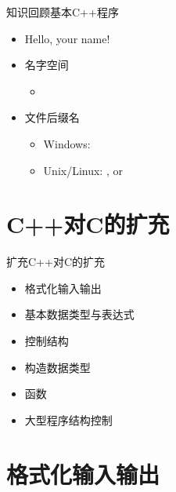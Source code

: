 \begin{frame}[fragile]{知识回顾}{基本C++程序}
  \begin{spacing}{1.1}%
  \begin{itemize}
  \item Hello, your name!\\
    \begin{center}
      \begin{minipage}{0.45\linewidth}
      \end{minipage}
    \end{center}
  \item 名字空间
    \begin{itemize}
    \item {}
    \end{itemize}
  \item 文件后缀名
    \begin{itemize}
    \item Windows: 
    \item Unix/Linux: ,  or 
    \end{itemize}
  \end{itemize}
  \end{spacing}%
\end{frame}

\section[对C的扩充]{C++对C的扩充}\label{sec:chap02-sec01}
\begin{frame}{扩充}{C++对C的扩充}
  \stretchon
  \begin{itemize}
  \item 格式化输入输出
  \item 基本数据类型与表达式
  \item 控制结构
  \item 构造数据类型
  \item 函数
  \item 大型程序结构控制
  \end{itemize}
  \stretchoff
\end{frame} 

\section[输入输出]{格式化输入输出}\label{sec:chap02-sec02}
